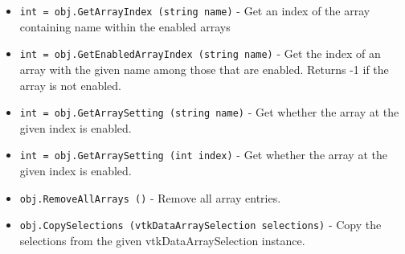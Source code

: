 \begin{itemize}
\item  \verb|int = obj.GetArrayIndex (string name)| -  Get an index of the array containing name within the enabled arrays

\item  \verb|int = obj.GetEnabledArrayIndex (string name)| -  Get the index of an array with the given name among those
 that are enabled.  Returns -1 if the array is not enabled.

\item  \verb|int = obj.GetArraySetting (string name)| -  Get whether the array at the given index is enabled.

\item  \verb|int = obj.GetArraySetting (int index)| -  Get whether the array at the given index is enabled.

\item  \verb|obj.RemoveAllArrays ()| -  Remove all array entries.

\item  \verb|obj.CopySelections (vtkDataArraySelection selections)| -  Copy the selections from the given vtkDataArraySelection instance.

\end{itemize}

